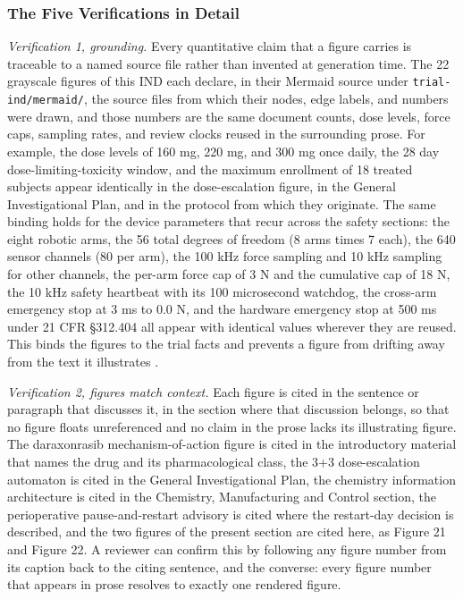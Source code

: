 \subsubsection{The Five Verifications in Detail}

\textit{Verification 1, grounding.} Every quantitative claim that a figure carries
is traceable to a named source file rather than invented at generation time. The
22 grayscale figures of this IND each declare, in their Mermaid source under
\texttt{trial-ind/mermaid/}, the source files from which their nodes, edge labels,
and numbers were drawn, and those numbers are the same document counts, dose
levels, force caps, sampling rates, and review clocks reused in the surrounding
prose. For example, the dose levels of 160 mg, 220 mg, and 300 mg once daily, the
28 day dose-limiting-toxicity window, and the maximum enrollment of 18 treated
subjects appear identically in the dose-escalation figure, in the General
Investigational Plan, and in the protocol from which they originate. The same
binding holds for the device parameters that recur across the safety sections:
the eight robotic arms, the 56 total degrees of freedom (8 arms times 7 each), the
640 sensor channels (80 per arm), the 100 kHz force sampling and 10 kHz sampling
for other channels, the per-arm force cap of 3 N and the cumulative cap of 18 N,
the 10 kHz safety heartbeat with its 100 microsecond watchdog, the cross-arm
emergency stop at 3 ms to 0.0 N, and the hardware emergency stop at 500 ms under
21 CFR \S 312.404 all appear with identical values wherever they are reused. This
binds the figures to the trial facts and prevents a figure from drifting away from
the text it illustrates \cite{oncotrialllm, pdacdigtwinp}.

\textit{Verification 2, figures match context.} Each figure is cited in the
sentence or paragraph that discusses it, in the section where that discussion
belongs, so that no figure floats unreferenced and no claim in the prose lacks its
illustrating figure. The daraxonrasib mechanism-of-action figure is cited in the
introductory material that names the drug and its pharmacological class, the 3+3
dose-escalation automaton is cited in the General Investigational Plan, the
chemistry information architecture is cited in the Chemistry, Manufacturing and
Control section, the perioperative pause-and-restart advisory is cited where the
restart-day decision is described, and the two figures of the present section are
cited here, as Figure 21 and Figure 22. A reviewer can confirm this by following
any figure number from its caption back to the citing sentence, and the converse:
every figure number that appears in prose resolves to exactly one rendered figure.

